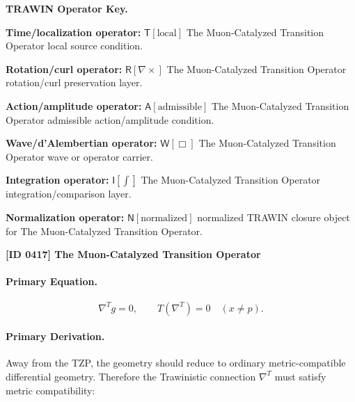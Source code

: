 \par\vspace{0.45\baselineskip}
\noindent\begin{minipage}[t]{\linewidth}
\begingroup
\small
\raggedright
\textbf{TRAWIN Operator Key.}\par
\noindent\textbf{Time/localization operator:} $\mathsf{T}\!\left[\mathrm{local}\right]$ The Muon-Catalyzed Transition Operator local source condition.\par
\noindent\textbf{Rotation/curl operator:} $\mathsf{R}\!\left[\nabla\times\right]$ The Muon-Catalyzed Transition Operator rotation/curl preservation layer.\par
\noindent\textbf{Action/amplitude operator:} $\mathsf{A}\!\left[\mathrm{admissible}\right]$ The Muon-Catalyzed Transition Operator admissible action/amplitude condition.\par
\noindent\textbf{Wave/d'Alembertian operator:} $\mathsf{W}\!\left[\Box\right]$ The Muon-Catalyzed Transition Operator wave or operator carrier.\par
\noindent\textbf{Integration operator:} $\mathsf{I}\!\left[\int\right]$ The Muon-Catalyzed Transition Operator integration/comparison layer.\par
\noindent\textbf{Normalization operator:} $\mathsf{N}\!\left[\mathrm{normalized}\right]$ normalized TRAWIN closure object for The Muon-Catalyzed Transition Operator.\par
\endgroup
\end{minipage}

\clearpage
\noindent\textbf{[ID 0417] The Muon-Catalyzed Transition Operator}\par
\vspace{0.35em}
\paragraph{Primary Equation.}
\begin{equation}
\nabla^{T}g=0,
\qquad
T(\nabla^{T})=0
\quad
(x\neq p).
\end{equation}

\paragraph{Primary Derivation.}
Away from the TZP, the geometry should reduce to ordinary metric-compatible differential geometry. Therefore the Trawinistic connection $\nabla^{T}$ must satisfy metric compatibility:

